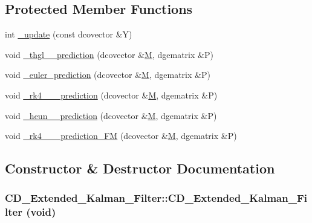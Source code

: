 \subsection*{Protected Member Functions}
\begin{CompactItemize}
\item 
int \hyperlink{class_c_d___extended___kalman___filter_7cfd2bf966970f44f4e1480ed3852b69}{\_\-update} (const dcovector \&Y)
\item 
void \hyperlink{class_c_d___extended___kalman___filter_e11771d2cea027b53e17091e817e59bd}{\_\-thgl\_\-\_\-prediction} (dcovector \&\hyperlink{class_c_d___filter_1388124f777df49de87fa59058535cde}{M}, dgematrix \&P)
\item 
void \hyperlink{class_c_d___extended___kalman___filter_64fda06630749c6d5936fd7257690c68}{\_\-euler\_\-prediction} (dcovector \&\hyperlink{class_c_d___filter_1388124f777df49de87fa59058535cde}{M}, dgematrix \&P)
\item 
void \hyperlink{class_c_d___extended___kalman___filter_79f174e2ff2bb51ada2d1cee3240fbb1}{\_\-rk4\_\-\_\-\_\-prediction} (dcovector \&\hyperlink{class_c_d___filter_1388124f777df49de87fa59058535cde}{M}, dgematrix \&P)
\item 
void \hyperlink{class_c_d___extended___kalman___filter_f67b43de36333a88e233bb6c51d15ab7}{\_\-heun\_\-\_\-prediction} (dcovector \&\hyperlink{class_c_d___filter_1388124f777df49de87fa59058535cde}{M}, dgematrix \&P)
\item 
void \hyperlink{class_c_d___extended___kalman___filter_aff3514a20d714c817780fa1871f4a9d}{\_\-rk4\_\-\_\-\_\-prediction\_\-FM} (dcovector \&\hyperlink{class_c_d___filter_1388124f777df49de87fa59058535cde}{M}, dgematrix \&P)
\end{CompactItemize}


\subsection{Constructor \& Destructor Documentation}
\hypertarget{class_c_d___extended___kalman___filter_a513c87055e01494c950391047fe8e78}{
\subsubsection[{CD\_\-Extended\_\-Kalman\_\-Filter}]{\setlength{\rightskip}{0pt plus 5cm}CD\_\-Extended\_\-Kalman\_\-Filter::CD\_\-Extended\_\-Kalman\_\-Filter (void)}}
\label{class_c_d___extended___kalman___filter_a513c87055e01494c950391047fe8e78}


